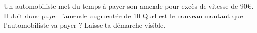 %
%
    Un automobiliste met du temps à payer son amende pour excès de vitesse de 90€. Il doit donc payer l’amende augmentée de 10%
    Quel est le nouveau montant que l’automobiliste va payer ? Laisse ta démarche visible.
